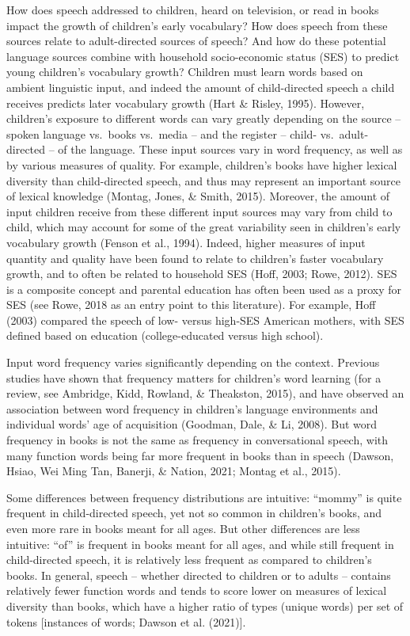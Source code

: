 \documentclass[10pt, letterpaper]{article}
\begin{document}
How does speech addressed to children, heard on television, or read in
books impact the growth of children's early vocabulary? How does speech
from these sources relate to adult-directed sources of speech? And how
do these potential language sources combine with household
socio-economic status (SES) to predict young children's vocabulary
growth? Children must learn words based on ambient linguistic input, and
indeed the amount of child-directed speech a child receives predicts
later vocabulary growth (Hart \& Risley, 1995). However, children's
exposure to different words can vary greatly depending on the source --
spoken language vs.~books vs.~media -- and the register -- child-
vs.~adult-directed -- of the language. These input sources vary in word
frequency, as well as by various measures of quality. For example,
children's books have higher lexical diversity than child-directed
speech, and thus may represent an important source of lexical knowledge
(Montag, Jones, \& Smith, 2015). Moreover, the amount of input children
receive from these different input sources may vary from child to child,
which may account for some of the great variability seen in children's
early vocabulary growth (Fenson et al., 1994). Indeed, higher measures
of input quantity and quality have been found to relate to children's
faster vocabulary growth, and to often be related to household SES
(Hoff, 2003; Rowe, 2012). SES is a composite concept and parental
education has often been used as a proxy for SES (see Rowe, 2018 as an
entry point to this literature). For example, Hoff (2003) compared the
speech of low- versus high-SES American mothers, with SES defined based
on education (college-educated versus high school).

Input word frequency varies significantly depending on the context.
Previous studies have shown that frequency matters for children's word
learning (for a review, see Ambridge, Kidd, Rowland, \& Theakston,
2015), and have observed an association between word frequency in
children's language environments and individual words' age of
acquisition (Goodman, Dale, \& Li, 2008). But word frequency in books is
not the same as frequency in conversational speech, with many function
words being far more frequent in books than in speech (Dawson, Hsiao,
Wei Ming Tan, Banerji, \& Nation, 2021; Montag et al., 2015).

Some differences between frequency distributions are intuitive:
``mommy'' is quite frequent in child-directed speech, yet not so common
in children's books, and even more rare in books meant for all ages. But
other differences are less intuitive: ``of'' is frequent in books meant
for all ages, and while still frequent in child-directed speech, it is
relatively less frequent as compared to children's books. In general,
speech -- whether directed to children or to adults -- contains
relatively fewer function words and tends to score lower on measures of
lexical diversity than books, which have a higher ratio of types (unique
words) per set of tokens {[}instances of words; Dawson et al. (2021){]}.
\end{document}
